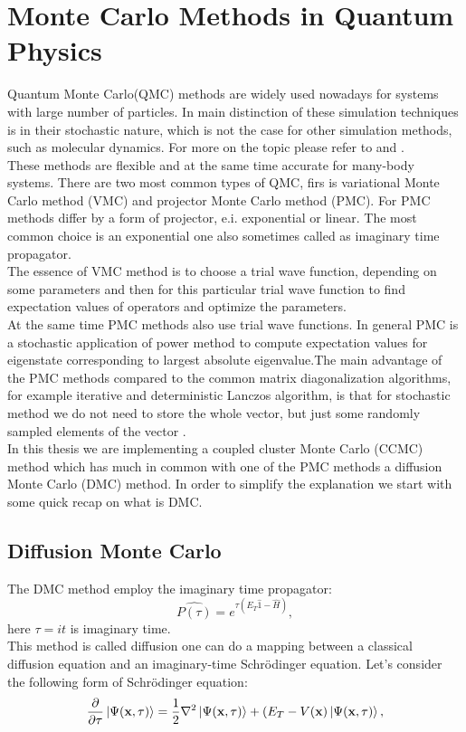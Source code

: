 \documentclass[twoside,english]{uiofysmaster}
\theoremstyle{definition}
\begin{document}
\chapter{Monte Carlo Methods in Quantum Physics}
Quantum Monte Carlo(QMC) methods are widely used nowadays for systems with large number of particles. In main distinction of these simulation techniques is in their stochastic nature, which is not the case for other simulation methods, such as molecular dynamics. For more on the topic please refer to \cite{hammondMonteCarloMethods1994} and \cite{kalosMonteCarloMethods2008}. \\
These methods are flexible and at the same time accurate for many-body systems. There are two most common types of QMC, firs is variational Monte Carlo method (VMC) and projector Monte Carlo method (PMC). For PMC methods differ by a form of projector, e.i. exponential or linear. The most common choice is an exponential one also sometimes called as imaginary time propagator.\\
The essence of VMC method is to choose a trial wave function, depending on some parameters and then for this particular trial wave function to find expectation values of operators and optimize the parameters.\\
At the same time PMC methods also use trial wave functions. In general PMC is a stochastic application of power method to compute expectation values for eigenstate corresponding to largest absolute eigenvalue.The main advantage of the PMC methods compared to the common matrix diagonalization algorithms, for example iterative and deterministic Lanczos algorithm, is that for stochastic method we do not need to store the whole vector, but just some randomly sampled elements of the vector \cite{umrigarObservationsVariationalProjector2015}. \\
In this thesis we are implementing a coupled cluster Monte Carlo (CCMC) method which has much in common with one of the PMC methods a diffusion Monte Carlo (DMC) method. In order to simplify the explanation we start with some quick recap on what is DMC.\\
\section{Diffusion Monte Carlo} \label{sec:DMC}
The DMC method employ the imaginary time propagator:
\begin{equation}
\hat{P(\tau)}=e^{\tau(E_T\hat{1}- \hat{H})},
\end{equation}
here $\tau= it$ is imaginary time.\\
This method is called  diffusion one can do a mapping between a classical diffusion equation and an imaginary-time Schr\"{o}dinger equation. Let's consider the following form of  Schr\"{o}dinger equation:
\begin{equation}\label{eq:imaginary_schrod}
		\frac{\partial }{ \partial \tau}\ket{\Psi(\textbf{x},\tau)} = \frac{1}{2} \nabla^2 \ket{\Psi(\textbf{x},\tau)} + (E_T - V(\textbf{x}) \ket{\Psi(\textbf{x},\tau)},
\end{equation}
\end{document}
